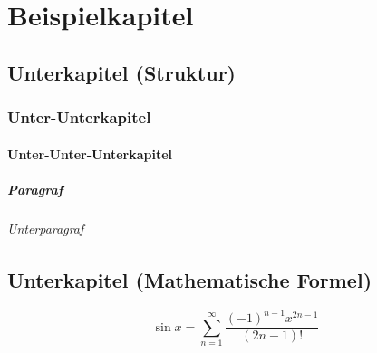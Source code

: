 \chapter{Beispielkapitel}
\lipsum[1] \autocite{samulowitzBibliothekUndDokumentation2003,sarrafzadehKnowledgeManagementIts2010,saurWissenschaftlicheVerlageVersuch2016,scholzeOpenAccessUnd2016,schrettingerVersuchVollstaendigenLehrbuchs1829,seadleFragilityFutureLibrary2016,siegfriedNutzerbezogeneMarktforschungFuer2014}

\section{Unterkapitel (Struktur)}
\lipsum[3-4]

\subsection{Unter-Unterkapitel}
\lipsum[5-6]

\subsubsection{Unter-Unter-Unterkapitel}
\lipsum[66]

\paragraph{Paragraf}
\lipsum[66]

\subparagraph{Unterparagraf}
\lipsum[75]

\section{Unterkapitel (Mathematische Formel)}
\lipsum[1-5]
\begin{equation}
	\sin x = \sum\limits_{n = 1}^{\infty}{\frac{{\left( { - 1} \right)^{n - 1} x^{2n - 1} }}{{\left( {2n - 1} \right)!}}}
\end{equation}
\lipsum[1]